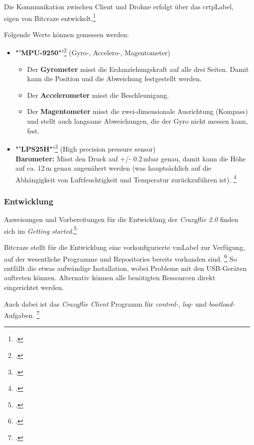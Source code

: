 Die Kommunikation zwischen Client und Drohne erfolgt über das \gls{crtpLabel}, eigen von Bitcraze entwickelt.\footcite{doc_crazyflie_crtp_index_Bitcraze_Wiki_2015-03-30}

Folgende Werte können gemessen werden:
\begin{itemize}
	\item \textbf{"'MPU-9250"'}\footcite{MEMS_Gyro-Accel_Gyroscope_Accelerometer_Processing_-_MPU-9250_Nine-Axis_2015-03-30} (Gyro-, Accelero-, Magentometer)
	\begin{itemize}
		\item Der \textbf{Gyrometer} misst die Erdanziehungskraft auf alle drei Seiten. Damit kann die Position und die Abweichung festgestellt werden.
		\item Der \textbf{Accelerometer} misst die Beschleunigung.
		\item Der \textbf{Magentometer} misst die zwei-dimensionale Ausrichtung (Kompass) und stellt auch langsame Abweichungen, die der Gyro nicht messen kann, fest.
	\end{itemize}
	\item \textbf{"'LPS25H"'}\footcite{Class-Leading_Miniature_Pressure_Sensor_from_STMicroelectronics_Powers_New_Chapter_in_Mobile_Innovation_2015-03-30} (High precision pressure sensor)\\
	\textbf{Barometer:} Misst den Druck auf +/- 0.2\,mbar genau, damit kann die Höhe auf ca. 12\,m genau angenähert werden (was hauptsächlich auf die Abhängigkeit von Luftfeuchtigkeit und Temperatur zurückzuführen ist).
	\footcite{Barometrische_Hoehenformel__Wikipedia_2015-03-30}
\end{itemize}

\subsubsection{Entwicklung}
Anweisungen und Vorbereitungen für die Entwicklung der \textit{Crazyflie 2.0} finden sich im \textit{Getting started}.\footcite{doc_crazyflie_dev:starting_Bitcraze_Wiki_2015-03-29}

Bitcraze stellt für die Entwicklung eine vorkonfigurierte \gls{vmLabel} zur Verfügung, auf der wesentliche Programme und Repositories bereits vorhanden sind.
\footcite{projects_virtualmachine_index_Bitcraze_Wiki_2015-03-30}
So entfällt die etwas aufwändige Installation, wobei Probleme mit den USB-Geräten auftreten können. Alternativ können alle benötigten Ressourcen direkt eingerichtet werden.

Auch dabei ist das \textit{Crazyflie Client} Programm für \textit{control-}, \textit{log-} und \textit{bootload-}Aufgaben.
\footcite{doc_crazyflie_client_pycfclient_index_Bitcraze_Wiki_2015-03-30}

